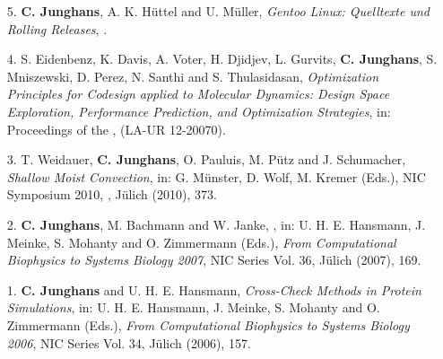\documentclass{article}
\begin{document}
\begin{enumerate}
\item[5.] \textbf{C. Junghans}, A. K. H{\"u}ttel and U. M{\"u}ller, 
  \textit{Gentoo Linux: Quelltexte und Rolling Releases},
  .

\item[4.] S. Eidenbenz, K. Davis, A. Voter, H. Djidjev, L. Gurvits, \textbf{C. Junghans}, S. Mniszewski, D. Perez, N. Santhi and S. Thulasidasan,
  \textit{Optimization Principles for Codesign applied to Molecular Dynamics: Design Space Exploration, Performance Prediction, and Optimization Strategies},
  in: Proceedings of the , (LA-UR 12-20070). 

\item[3.] T. Weidauer, \textbf{C. Junghans}, O. Pauluis, M. P{\"u}tz and J. Schumacher,
  \textit{Shallow Moist Convection},
  in: G. M{\"u}nster, D. Wolf, M. Kremer (Eds.),
  NIC Symposium 2010, , J{\"u}lich (2010), 373.

\item[2.] \textbf{C. Junghans}, M. Bachmann and W. Janke,
  \textit{},
  in: U. H. E. Hansmann, J. Meinke, S. Mohanty and O. Zimmermann (Eds.),
  \textit{From Computational Biophysics to Systems Biology 2007}, NIC Series Vol. 36, J{\"u}lich (2007), 169.

\item[1.] \textbf{C. Junghans} and U. H. E. Hansmann,
  \textit{Cross-Check Methods in Protein Simulations},
  in: U. H. E. Hansmann, J. Meinke, S. Mohanty and O. Zimmermann (Eds.),
  \textit{From Computational Biophysics to Systems Biology 2006},
  NIC Series Vol. 34, J{\"u}lich (2006), 157.
\end{enumerate}
\end{document}
